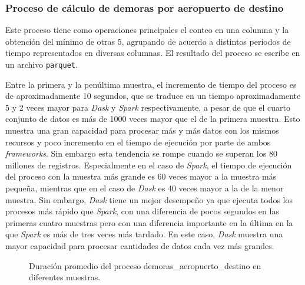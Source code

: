 \subsubsection{Proceso de cálculo de demoras por aeropuerto de destino}

Este proceso tiene como operaciones principales el conteo en una columna y la obtención del mínimo de otras 5, agrupando de acuerdo a distintos periodos de tiempo representados en diversas columnas. El resultado del proceso se escribe en un archivo \texttt{parquet}.

Entre la primera y la penúltima muestra, el incremento de tiempo del proceso es de aproximadamente 10 segundos, que se traduce en un tiempo aproximadamente 5 y 2 veces mayor para \textit{Dask} y \textit{Spark} respectivamente, a pesar de que el cuarto conjunto de datos es más de 1000 veces mayor que el de la primera muestra. Esto muestra una gran capacidad para procesar más y más datos con los mismos recursos y poco incremento en el tiempo de ejecución por parte de ambos \textit{frameworks}. Sin embargo esta tendencia se rompe cuando se superan los 80 millones de registros. Especialmente en el caso de \textit{Spark}, el tiempo de ejecución del proceso con la muestra más grande es 60 veces mayor a la muestra más pequeña, mientras que en el caso de \textit{Dask} es 40 veces mayor a la de la menor muestra. Sin embargo, \textit{Dask} tiene un mejor desempeño ya que ejecuta todos los procesos más rápido que \textit{Spark}, con una diferencia de pocos segundos en las primeras cuatro muestras pero con una diferencia importante en la última en la que \textit{Spark} es más de tres veces más tardado. En este caso, \textit{Dask} muestra una mayor capacidad para procesar cantidades de datos cada vez más grandes.

\begin{figure}
\centering
{}
\caption{Duración promedio del proceso demoras\_aeropuerto\_destino en diferentes muestras.}
\label{lineas:local-demoras-aeropuerto-destino}
\end{figure}


